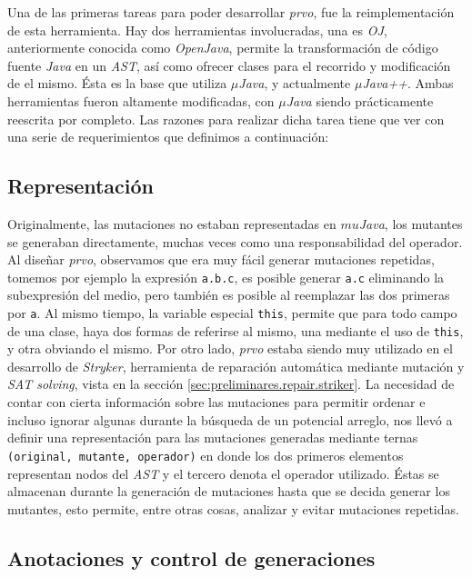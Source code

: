 Una de las primeras tareas para poder desarrollar \emph{prvo}, fue la reimplementaci\'on de esta herramienta. Hay dos herramientas involucradas, una es \emph{OJ}, anteriormente conocida como \emph{OpenJava}, permite la transformaci\'on de c\'odigo fuente \emph{Java} en un \emph{AST}, as\'i como ofrecer clases para el recorrido y modificaci\'on de el mismo. \'Esta es la base que utiliza \emph{$\mu$Java}, y actualmente \emph{$\mu$Java++}. Ambas herramientas fueron altamente modificadas, con \emph{$\mu$Java} siendo pr\'acticamente reescrita por completo. Las razones para realizar dicha tarea tiene que ver con una serie de requerimientos que definimos a continuaci\'on:

\subsection{Representaci\'on}

Originalmente, las mutaciones no estaban representadas en \emph{$mu$Java}, los mutantes se generaban directamente, muchas veces como una responsabilidad del operador. Al dise\~nar \emph{prvo}, observamos que era muy f\'acil generar mutaciones repetidas, tomemos por ejemplo la expresi\'on \lstinline|a.b.c|, es posible generar \lstinline|a.c| eliminando la subexpresi\'on del medio, pero tambi\'en es posible al reemplazar las dos primeras por \lstinline|a|. Al mismo tiempo, la variable especial \lstinline|this|, permite que para todo campo de una clase, haya dos formas de referirse al mismo, una mediante el uso de \lstinline|this|, y otra obviando el mismo. Por otro lado, \emph{prvo} estaba siendo muy utilizado en el desarrollo de \emph{Stryker}, herramienta de reparaci\'on autom\'atica mediante mutaci\'on y \emph{SAT solving}, vista en la secci\'on \ref{sec:preliminares.repair.striker}. La necesidad de contar con cierta informaci\'on sobre las mutaciones para permitir ordenar e incluso ignorar algunas durante la b\'usqueda de un potencial arreglo, nos llev\'o a definir una representaci\'on para las mutaciones generadas mediante ternas \texttt{(original, mutante, operador)} en donde los dos primeros elementos representan nodos del \emph{AST} y el tercero denota el operador utilizado. \'Estas se almacenan durante la generaci\'on de mutaciones hasta que se decida generar los mutantes, esto permite, entre otras cosas, analizar y evitar mutaciones repetidas.

\subsection{Anotaciones y control de generaciones}

